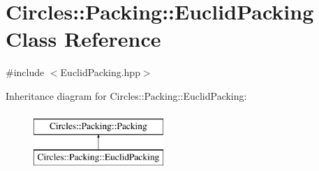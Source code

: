 \hypertarget{class_circles_1_1_packing_1_1_euclid_packing}{}\section{Circles\+:\+:Packing\+:\+:Euclid\+Packing Class Reference}
\label{class_circles_1_1_packing_1_1_euclid_packing}


{\ttfamily \#include $<$Euclid\+Packing.\+hpp$>$}

Inheritance diagram for Circles\+:\+:Packing\+:\+:Euclid\+Packing\+:\begin{figure}[H]
\begin{center}
\leavevmode
\includegraphics[height=2.000000cm]{class_circles_1_1_packing_1_1_euclid_packing}
\end{center}
\end{figure}

